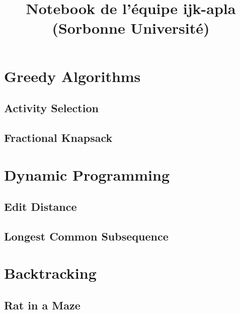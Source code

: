\documentclass[10pt,a4paper]{article}
\title{\vspace{-4ex}\Large{Notebook de l'équipe \textbf{ijk-apla} (Sorbonne Université)}}
\author{}
\date{}
\begin{document}
\begin{landscape}
\begin{multicols*}{2}

\maketitle
\tableofcontents

\section{Greedy Algorithms}

\subsection{Activity Selection}



\subsection{Fractional Knapsack}



\section{Dynamic Programming}

\subsection{Edit Distance}



\subsection{Longest Common Subsequence}



\section{Backtracking}

\subsection{Rat in a Maze}


\end{multicols*}
\end{landscape}
\end{document}
